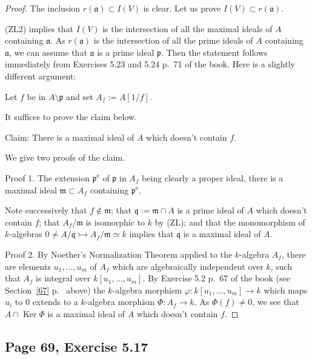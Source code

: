 \documentclass[parskip=half,fontsize=12pt]{scrartcl}%
\newcommand{\oo}{\operatorname}\newcommand{\ooo}{\operatorname*}
\newcommand{\mf}{\mathfrak}
\newcommand{\aaa}{\mf a}
\newcommand{\mmm}{\mf m}
\newcommand{\ppp}{\mf p}
\newcommand{\qqq}{\mf q}
\newcommand{\mono}{\rightarrowtail}
\begin{document}
\begin{proof} 
The inclusion $r(\aaa)\subset I(V)$ is clear. Let us prove $I(V)\subset r(\aaa)$. 

(ZL2) implies that $I(V)$ is the intersection of all the maximal ideals of $A$ containing $\aaa$. As $r(\aaa)$ is the intersection of all the prime ideals of $A$ containing $\aaa$, we can assume that $\aaa$ is a prime ideal $\ppp$. Then the statement follows immediately from Exercises 5.23 and 5.24 p.~71 of the book. Here is a slightly different argument:

Let $f$ be in $A\setminus\ppp$ and set $A_f:=A[1/f]$.

It suffices to prove the claim below.

Claim: There is a maximal ideal of $A$ which doesn't contain $f$. 

We give two proofs of the claim.

Proof 1. The extension $\ppp^{\oo e}$ of $\ppp$ in $A_f$ being clearly a proper ideal, there is a maximal ideal $\mmm\subset A_f$ containing $\ppp^{\oo e}$. 

Note successively that $f\notin\mmm$; that $\qqq:=\mmm\cap A$ is a prime ideal of $A$ which doesn't contain $f$; that $A_f/\mmm$ is isomorphic to $k$ by (ZL); and that the monomorphism of $k$-algebras $0\ne A/\qqq\mono A_f/\mmm\simeq k$ implies that $\qqq$ is a maximal ideal of $A$.

Proof 2. By Noether's Normalization Theorem applied to the $k$-algebra $A_f$, there are elements $u_1,\dots,u_m$ of $A_f$ which are algebraically independent over $k$, such that $A_f$ is integral over $k[u_1,\dots,u_m]$. By Exercise 5.2 %
p.~67 of the book (see Section~\ref{67} p.~\pageref{67} above) the $k$-algebra morphism $\varphi:k[u_1,\dots,u_m]\to k$ which maps $u_i$ to $0$ extends to a $k$-algebra morphism $\Phi:A_f\to k$. As $\Phi(f)\ne0$, we see that $A\cap\oo{Ker}\Phi$ is a maximal ideal of $A$ which doesn't contain $f$.
\end{proof}

\subsection{Page 69, Exercise 5.17}%
\end{document}
